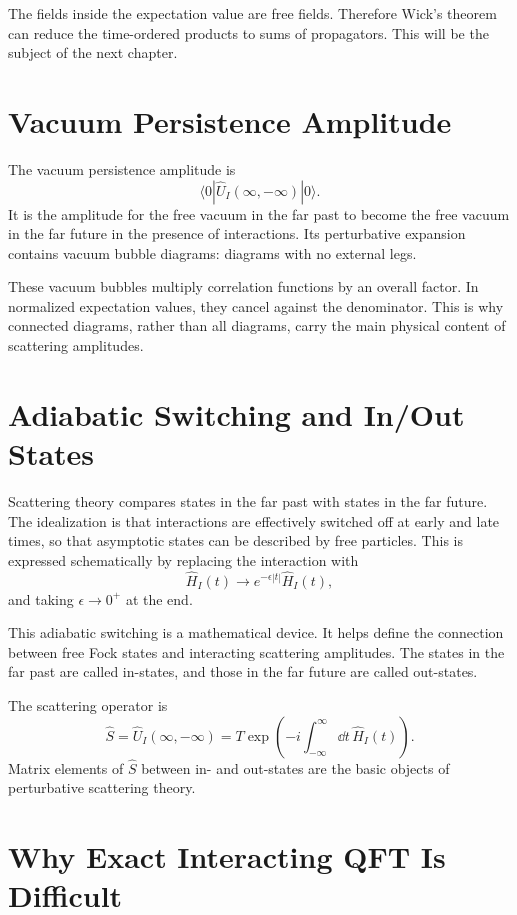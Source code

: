 The fields inside the expectation value are free fields. Therefore Wick's
theorem can reduce the time-ordered products to sums of propagators. This will
be the subject of the next chapter.

\section{Vacuum Persistence Amplitude}

The vacuum persistence amplitude is
\[
    \langle0|\hat U_I(\infty,-\infty)|0\rangle.
\]
It is the amplitude for the free vacuum in the far past to become the free
vacuum in the far future in the presence of interactions. Its perturbative
expansion contains vacuum bubble diagrams: diagrams with no external legs.

These vacuum bubbles multiply correlation functions by an overall factor. In
normalized expectation values, they cancel against the denominator. This is why
connected diagrams, rather than all diagrams, carry the main physical content of
scattering amplitudes.

\section{Adiabatic Switching and In/Out States}

Scattering theory compares states in the far past with states in the far future.
The idealization is that interactions are effectively switched off at early and
late times, so that asymptotic states can be described by free particles. This
is expressed schematically by replacing the interaction with
\[
    \hat H_I(t)\longrightarrow e^{-\epsilon |t|}\hat H_I(t),
\]
and taking \(\epsilon\to0^+\) at the end.

This adiabatic switching is a mathematical device. It helps define the
connection between free Fock states and interacting scattering amplitudes. The
states in the far past are called in-states, and those in the far future are
called out-states.

The scattering operator is
\[
    \hat S
    = \hat U_I(\infty,-\infty)
    = T\exp\left(-i\int_{-\infty}^{\infty}\dd t\,\hat H_I(t)\right).
\]
Matrix elements of \(\hat S\) between in- and out-states are the basic objects
of perturbative scattering theory.

\section{Why Exact Interacting QFT Is Difficult}

